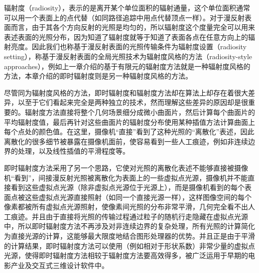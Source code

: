 




辐射度（radiosity），表示的是离开某个单位面积的辐射通量，这个单位面积通常可以用一个表面上的点代替（如同路径追踪中用点代替顶点一样）。对于漫反射表面而言，由于其各个方向反射的光照是均匀的，所以辐射度这个度量完全可以用来表述表面的光照分布，因为知道了辐射度就等于知道了表面各点在任意方向上的辐射亮度。因此我们也称基于漫反射表面的光照传输条件为辐射度设置（radiosity setting），称基于漫反射表面的全局光照技术为辐射度风格的方法（radiosity-style approaches），例如上一章介绍的基于有限元的辐射度方法就是一种辐射度风格的方法，本章介绍的即时辐射度则是另一种辐射度风格的方法。

尽管同为辐射度风格的方法，即时辐射度和辐射度方法却在算法上却存在着很大差异，以至于它们看起来完全是两种独立的技术，然而理解这些差异的原因却是很重要的。辐射度方法直接将整个几何场景细分成微小曲面片，然后计算每个曲面片的平均辐射度值，最后再针对这些曲面片的辐射度分布使用某种插值方法计算曲面上每个点处的颜色值。在这里，摄像机“直接”看到了这种光照的“离散化”表述，因此离散化的很多细节被暴露在摄像机面前，使容易看到一些人工痕迹，例如非连续边界的处理，以及线性插值的平滑程度等。

即时辐射度方法采用了另一个思路，它使对光照的离散化表述不能够直接被摄像机“看到”，间接漫反射光照被离散化为表面上的一些虚拟点光源，摄像机并不能直接看到这些虚拟点光源（除非虚拟点光源位于光源上），而是摄像机看到的每个表面点被这些虚拟点光源直接照射（如同一个直接光源一样），这样图像空间的每个像素都被所有虚拟点光源照射，使像素间光照的分布非常平滑，几何完全看不出人工痕迹。并且由于直接将光照的传输过程通过粒子的随机行走隐藏在虚拟点光源中，所以即时辐射度方法不再涉及对非连续边界的复杂处理，所有光照的计算简化为直接光源的计算，这能够最大限度地结合图形处理器的优势。并且正是由于平滑的计算结果，即时辐射度方法可以使用（例如相对于形状系数）非常少量的虚拟点光源，使得即时辐射度方法相较于辐射度方法要高效得多，被广泛运用于早期的电影产业及交互式三维设计软件中。



